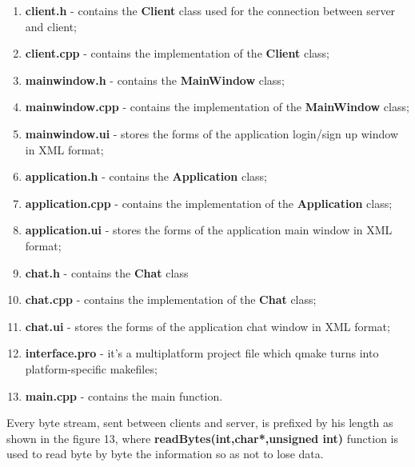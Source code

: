 \documentclass[runningheads]{llncs}
\begin{document}
\begin{enumerate}

\item \textbf{client.h} - contains the \textbf{Client} class used for the connection between server and client;
\item \textbf{client.cpp} - contains the implementation of the \textbf{Client} class;
\item \textbf{mainwindow.h} - contains the \textbf{MainWindow} class;
\item \textbf{mainwindow.cpp} -  contains the implementation of the \textbf{MainWindow} class;
\item \textbf{mainwindow.ui} - stores the forms of the application login/sign up window in XML format;
\item \textbf{application.h} - contains the \textbf{Application} class;
\item \textbf{application.cpp} - contains the implementation of the \textbf{Application} class;
\item \textbf{application.ui} - stores the forms of the application main window in XML format;
\item \textbf{chat.h} - contains the \textbf{Chat} class
\item \textbf{chat.cpp} - contains the implementation of the \textbf{Chat} class;
\item \textbf{chat.ui} - stores the forms of the application chat window in XML format;
\item \textbf{interface.pro} - it's a multiplatform project file which qmake turns into platform-specific makefiles;
\item \textbf{main.cpp} - contains the main function.
\end{enumerate}

\par Every byte stream, sent between clients and server, is prefixed by his length as shown in the figure 13, where \textbf{readBytes(int,char*,unsigned int)} function is used to read byte by byte the information so as not to lose data. 
\end{document}
